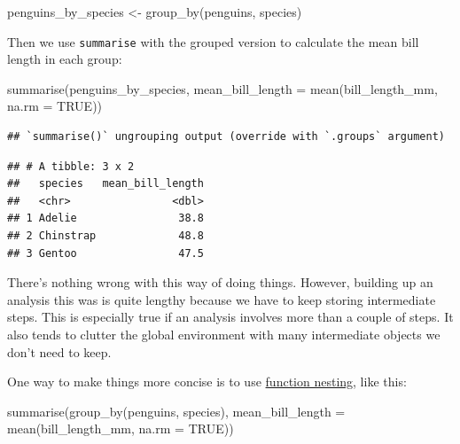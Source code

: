\documentclass[
]{book}
\newenvironment{Shaded}{\begin{snugshade}}{\end{snugshade}}
\newcommand{\AttributeTok}[1]{\textcolor[rgb]{0.77,0.63,0.00}{#1}}
\newcommand{\ConstantTok}[1]{\textcolor[rgb]{0.00,0.00,0.00}{#1}}
\newcommand{\FunctionTok}[1]{\textcolor[rgb]{0.00,0.00,0.00}{#1}}
\newcommand{\NormalTok}[1]{#1}
\newcommand{\OtherTok}[1]{\textcolor[rgb]{0.56,0.35,0.01}{#1}}
\begin{document}
\begin{Shaded}
\begin{Highlighting}[]
\NormalTok{penguins\_by\_species }\OtherTok{\textless{}{-}} \FunctionTok{group\_by}\NormalTok{(penguins, species)}
\end{Highlighting}
\end{Shaded}

Then we use \texttt{summarise} with the grouped version to calculate the mean bill length in each group:

\begin{Shaded}
\begin{Highlighting}[]
\FunctionTok{summarise}\NormalTok{(penguins\_by\_species, }
          \AttributeTok{mean\_bill\_length =} \FunctionTok{mean}\NormalTok{(bill\_length\_mm, }\AttributeTok{na.rm =} \ConstantTok{TRUE}\NormalTok{))}
\end{Highlighting}
\end{Shaded}

\begin{verbatim}
## `summarise()` ungrouping output (override with `.groups` argument)
\end{verbatim}

\begin{verbatim}
## # A tibble: 3 x 2
##   species   mean_bill_length
##   <chr>                <dbl>
## 1 Adelie                38.8
## 2 Chinstrap             48.8
## 3 Gentoo                47.5
\end{verbatim}

There's nothing wrong with this way of doing things. However, building up an analysis this was is quite lengthy because we have to keep storing intermediate steps. This is especially true if an analysis involves more than a couple of steps. It also tends to clutter the global environment with many intermediate objects we don't need to keep.

One way to make things more concise is to use \protect\hyperlink{combining-functions}{function nesting}, like this:

\begin{Shaded}
\begin{Highlighting}[]
\FunctionTok{summarise}\NormalTok{(}\FunctionTok{group\_by}\NormalTok{(penguins, species), }
          \AttributeTok{mean\_bill\_length =} \FunctionTok{mean}\NormalTok{(bill\_length\_mm, }\AttributeTok{na.rm =} \ConstantTok{TRUE}\NormalTok{))}
\end{Highlighting}
\end{Shaded}
\end{document}
